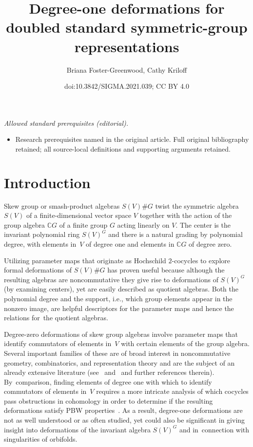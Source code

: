 \documentclass[10pt,a4paper]{amsart}
\title{Degree-one deformations for doubled standard symmetric-group representations}
\author{Briana Foster-Greenwood, Cathy Kriloff}
\date{doi:10.3842/SIGMA.2021.039; CC BY 4.0}
\numberwithin{equation}{section}
\begin{document}
\maketitle
\noindent\textit{Allowed standard prerequisites (editorial).}\begin{itemize}
\item Research prerequisites named in the original article. Full original bibliography retained; all source-local definitions and supporting arguments retained.
\end{itemize}\medskip
\section{Introduction}%

Skew group or smash-product algebras $S(V)\# G$ twist the symmetric algebra $S(V)$ of a
finite-dimensional vector space $V$ together with the action of the group algebra $\mathbb{C} G$
of a finite group $G$ acting linearly on $V$. The center is the invariant polynomial ring
$S(V)^G$ and there is a natural grading by polynomial degree, with elements in~$V$ of
degree one and elements in $\mathbb{C} G$ of degree zero.

Utilizing parameter maps that originate as Hochschild $2$-cocycles to explore formal
deformations of $S(V) \# G$ has proven useful because although the resulting algebras
are noncommutative they give rise to deformations of $S(V)^G$ (by examining centers),
yet are easily described
as quotient algebras. Both the polynomial degree and the support, i.e., which group elements
appear in the nonzero image, are helpful descriptors for the parameter maps and hence
the relations for~the quotient algebras.

Degree-zero deformations of skew group algebras involve parameter maps that
identify commutators of elements in~$V$ with certain elements of the
group algebra. Several important families of these are of broad
interest in noncommutative geometry, combinatorics, and representation theory
and are the subject of an already extensive literature (see~\cite{Gordon2008}
and~\cite{Gordon2010} and further references therein). By~comparison, finding elements of degree one with which to identify commutators
of elements in~$V$ requires a more intricate analysis of which cocycles pass obstructions in
cohomology in order to determine if the resulting deformations satisfy PBW properties~\cite{FGK, SWorbifold}.
As a result, degree-one deformations are not as well understood or as often studied, yet
could also be significant in giving insight into deformations of the invariant algebra
$S(V)^G$ and in~con\-nection with singularities of orbifolds.
\end{document}
